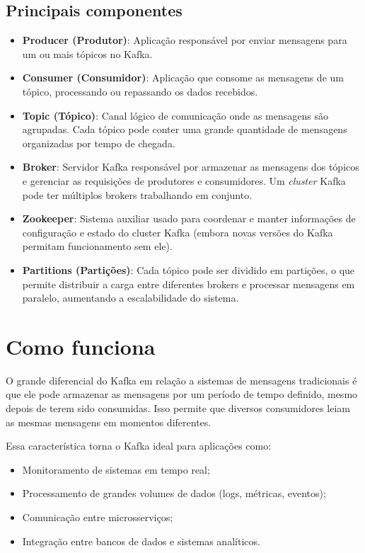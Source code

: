\documentclass{abntex2}
\begin{document}
\subsection{Principais componentes}
\begin{itemize}
    \item \textbf{Producer (Produtor)}: Aplicação responsável por enviar mensagens para um ou mais tópicos no Kafka.
    \item \textbf{Consumer (Consumidor)}: Aplicação que consome as mensagens de um tópico, processando ou repassando os dados recebidos.
    \item \textbf{Topic (Tópico)}: Canal lógico de comunicação onde as mensagens são agrupadas. Cada tópico pode conter uma grande quantidade de mensagens organizadas por tempo de chegada.
    \item \textbf{Broker}: Servidor Kafka responsável por armazenar as mensagens dos tópicos e gerenciar as requisições de produtores e consumidores. Um \textit{cluster} Kafka pode ter múltiplos brokers trabalhando em conjunto.
    \item \textbf{Zookeeper}: Sistema auxiliar usado para coordenar e manter informações de configuração e estado do cluster Kafka (embora novas versões do Kafka permitam funcionamento sem ele).
    \item \textbf{Partitions (Partições)}: Cada tópico pode ser dividido em partições, o que permite distribuir a carga entre diferentes brokers e processar mensagens em paralelo, aumentando a escalabilidade do sistema.
\end{itemize}

\section{Como funciona}
O grande diferencial do Kafka em relação a sistemas de mensagens tradicionais é que ele pode armazenar as mensagens por um período de tempo definido, mesmo depois de terem sido consumidas. 
Isso permite que diversos consumidores leiam as mesmas mensagens em momentos diferentes.

Essa característica torna o Kafka ideal para aplicações como:
\begin{itemize}
    \item Monitoramento de sistemas em tempo real;
    \item Processamento de grandes volumes de dados (logs, métricas, eventos);
    \item Comunicação entre microsserviços;
    \item Integração entre bancos de dados e sistemas analíticos.
\end{itemize}
\end{document}

